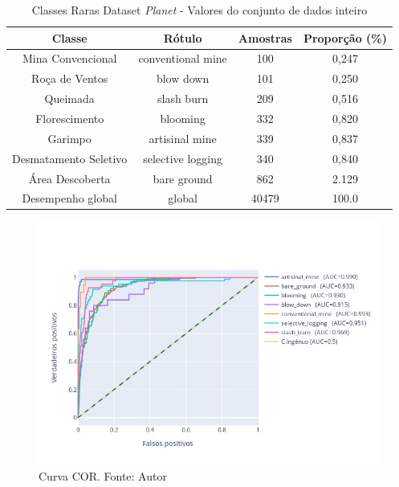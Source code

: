 \begin{table}[h!]
    \caption{Classes Raras Dataset \textit{Planet} - Valores do conjunto de dados inteiro}
    \centering
\begin{tabular}{*{4}{c}}
    \toprule
    Classe                  &            Rótulo &  Amostras      &  Proporção (\%) \\
    \midrule
    Mina Convencional       & conventional mine &        100     &       0,247 \\
    Roça de Ventos          &         blow down &        101     &       0,250 \\
    Queimada                &        slash burn &        209     &       0,516 \\
    Florescimento           &          blooming &        332     &       0,820 \\
    Garimpo                 &    artisinal mine &        339     &       0,837 \\
    Desmatamento Seletivo   & selective logging &        340     &       0,840 \\
    Área Descoberta         &       bare ground &        862     &       2.129 \\
    Desempenho global       &            global &        40479   &       100.0 \\
    \bottomrule
\end{tabular}
\label{table:Classes raras}
\end{table}

\begin{figure}[!ht]
    \centering
    \includegraphics[width=\columnwidth]{Imagens/results/rsp-resnet-50_planet_pt/Curva COR para classes raras.jpg}
    \caption{ Curva COR. Fonte: Autor}
   \label{fig:CurvaCORResnet50}
\end{figure} 

